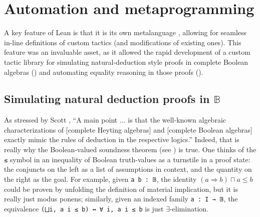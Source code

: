 \documentclass[sigplan,10pt,review, anonymous]{acmart}
\newcommand{\lil}{\lstinline}
\theoremstyle{definition}
\begin{document}
\section{Automation and metaprogramming}
\label{sect:metaprogramming}

A key feature of Lean is that it is its own metalanguage \cite{Ebner:2017:MFF:3136534.3110278}, allowing for seamless in-line definitions of custom tactics (and modifications of existing ones).
This feature was an invaluable asset, as it allowed the rapid development of a custom tactic library for simulating natural-deduction style proofs in complete Boolean algebras () and automating equality reasoning in those proofs ().

\subsection{Simulating natural deduction proofs in \(\mathbb{B}\)} \label{subsect:natded}
As stressed by Scott \cite{scott2008algebraic}, ``A main point ... is that the well-known algebraic characterizations of [complete Heyting algebras] and [complete Boolean algebras] exactly mimic the rules of deduction in the respective logics.''
Indeed, that is really why the Boolean-valued soundness theorem (see ) is true. One thinks of the \lil{≤} symbol in an inequality of Boolean truth-values as a turnstile in a proof state:
the conjuncts on the left as a list of assumptions in context, and the quantity on the right as the goal.
For example, given \lil{a b : 𝔹}, the identity $(a \Rightarrow b) \sqcap a \leq b$ could be proven by unfolding the definition of material implication, but it is really just modus ponens;
similarly, given an indexed family \lil{a : I → 𝔹}, the equivalence \lstinline{(⨆i, a i ≤ b) ↔ ∀ i, a i ≤ b} is just $\exists$-elimination.
\end{document}
